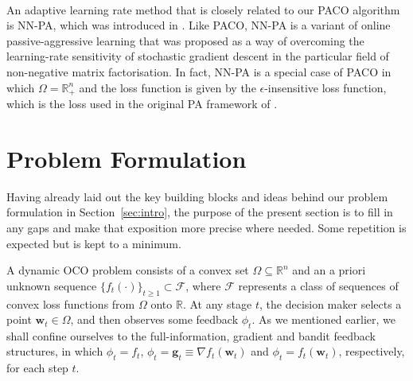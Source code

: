 \paragraph{\citep{blondel14}}

An adaptive learning rate method that is closely related to our PACO algorithm is NN-PA, which was introduced in \citep{blondel14}. Like PACO, NN-PA is a variant of online passive-aggressive learning that was proposed as a way of overcoming the learning-rate sensitivity of stochastic gradient descent in the particular field of non-negative matrix factorisation. In fact, NN-PA is a special case of PACO in which $\Omega = \mathbb{R}^n_+$ and the loss function is given by the $\epsilon$-insensitive loss function, which is the loss used in the original PA framework of \citet{crammer06}.


\section{Problem Formulation}

Having already laid out the key building blocks and ideas behind our problem formulation in Section~\ref{sec:intro}, the purpose of the present section is to fill in any gaps and make that exposition more precise where needed. Some repetition is expected but is kept to a minimum.

\begin{mccorrection}
A dynamic OCO problem consists of a convex set $\Omega \subseteq \mathbb{R}^n$ and an a priori unknown sequence $\{f_t(\cdot)\}_{t \geq 1} \subset \mathcal{F}$, where $\mathcal{F}$ represents a class of sequences of convex loss functions from $\Omega$ onto $\mathbb{R}$. At any stage $t$, the decision maker selects a point $\mathbf{w}_t \in \Omega$, and then observes some feedback $\phi_t$. As we mentioned earlier, we shall confine ourselves to the full-information, gradient and bandit feedback structures, in which $\phi_t = f_t$, $\phi_t = \mathbf{g}_t \equiv \nabla f_t(\mathbf{w}_t)$ and $\phi_t = f_t(\mathbf{w}_t)$, respectively, for each step $t$.
\end{mccorrection}

